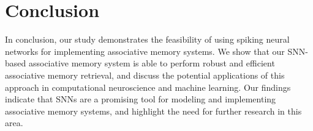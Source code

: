 \chapter{Conclusion}%
In conclusion, our study demonstrates the feasibility of using spiking neural networks for implementing associative memory systems. We show that our SNN-based associative memory system is able to perform robust and efficient associative memory retrieval, and discuss the potential applications of this approach in computational neuroscience and machine learning. Our findings indicate that SNNs are a promising tool for modeling and implementing associative memory systems, and highlight the need for further research in this area.\par
